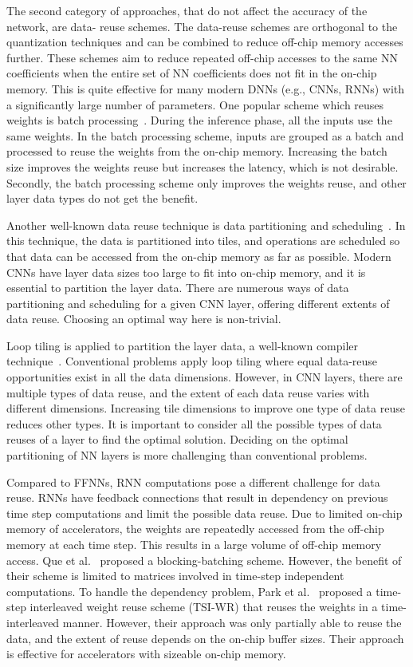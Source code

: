 The second category of approaches, that do not affect the accuracy of the network, are data-
reuse schemes. The data-reuse schemes are orthogonal to the quantization techniques and can be combined to reduce off-chip memory accesses further. These schemes aim to reduce repeated off-chip accesses to the same NN coefficients when the entire set of NN coefficients does not fit in the on-chip memory. This is quite effective for many modern DNNs (e.g., CNNs, RNNs) with a significantly large number of parameters. One popular scheme which reuses weights is batch processing~\cite{zhang2015optimizing,Li2018SmartShuttleOO,que2019efficient}. During the inference phase, all the inputs use the same weights. In the batch processing scheme, inputs are grouped as a batch and processed to reuse the weights from the on-chip memory. Increasing the batch size improves the weights reuse but increases the latency, which is not desirable. Secondly, the batch processing scheme only improves the weights reuse, and other layer data types do not get the benefit.

Another well-known data reuse technique is data partitioning and scheduling~\cite{zhang2015optimizing, Li2018SmartShuttleOO}. In this technique, the data is partitioned into tiles, and operations are scheduled so that data can be accessed from the on-chip memory as far as possible. Modern CNNs have layer data sizes too large to fit into on-chip memory, and it is essential to partition the layer data. There are numerous ways of data partitioning and scheduling for a given CNN layer, offering different extents of data reuse. Choosing an optimal way here is non-trivial.

Loop tiling is applied to partition the layer data, a well-known compiler technique~\cite{aho2006compilers}. Conventional problems apply loop tiling where equal data-reuse opportunities exist in all the data dimensions. However, in CNN layers, there are multiple types of data reuse, and the extent of each data reuse varies with different dimensions. Increasing tile dimensions to improve one type of data reuse reduces other types. It is important to consider all the possible types of data reuses of a layer to find the optimal solution. Deciding on the optimal partitioning of NN layers is more challenging than conventional problems.

Compared to FFNNs, RNN computations pose a different challenge for data reuse. RNNs have feedback connections that result in dependency on previous time step computations and limit the possible data reuse. Due to limited on-chip memory of accelerators, the weights are repeatedly accessed from the off-chip memory at each time step. This results in a large volume of off-chip memory access. Que et al.~\cite{que2019efficient} proposed a blocking-batching scheme. However, the benefit of their scheme is limited to matrices involved in time-step independent computations. To handle the dependency problem, Park et al.~\cite{park2020time} proposed a time-step interleaved weight reuse scheme (TSI-WR) that reuses the weights in a time-interleaved manner. However, their approach was only partially able to reuse the data, and the extent of reuse depends on the on-chip buffer sizes. Their approach is effective for accelerators with sizeable on-chip memory.

